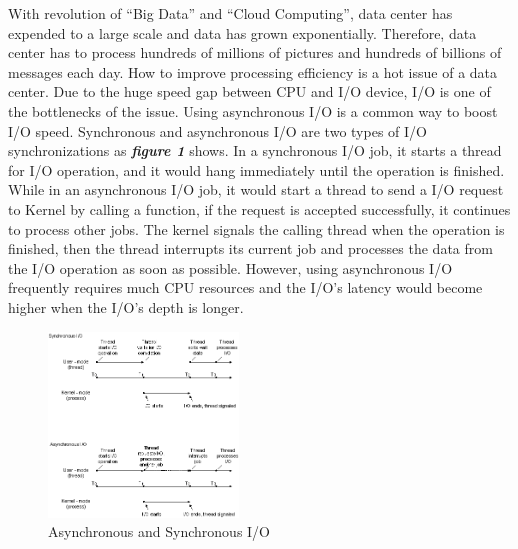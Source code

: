 \documentclass[conference]{IEEEtran}
\begin{document}

With revolution of “Big Data” and “Cloud Computing”, data center has expended to a large scale and data has grown exponentially.
Therefore, data center has to process hundreds of millions of pictures and hundreds of billions of messages each day.
How to improve processing efficiency is a hot issue of a data center.
Due to the huge speed gap between CPU and I/O device, I/O is one of the bottlenecks of the issue.
Using asynchronous I/O is a common way to boost I/O speed. Synchronous and asynchronous I/O are two types of I/O synchronizations as  \emph{\textbf{\large{figure 1}}} shows.
In a synchronous I/O job, it starts a thread for I/O operation, and it would hang immediately until the operation is finished.
While in an asynchronous I/O job, it would start a thread to send a I/O request to Kernel by calling a function, if the request is accepted successfully, it continues to process other jobs.
The kernel signals the calling thread when the operation is finished, then the thread interrupts its current job and processes the data from the I/O operation as soon as possible.
However, using asynchronous I/O frequently requires much CPU resources and the I/O's latency would become higher when the I/O's depth is longer.

\begin{figure}[htbp]
	\centering
	\includegraphics[width=0.45\textwidth]{fig2bedit.png}
	\caption{Asynchronous and Synchronous I/O}
\end{figure}
\end{document}
